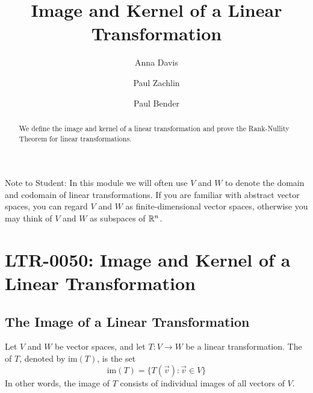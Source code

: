 \documentclass{ximera}
\author{Anna Davis \and Paul Zachlin \and Paul Bender} \title{Image and Kernel of a Linear Transformation} \license{CC-BY 4.0}
\begin{document}
\begin{abstract}
  We define the image and kernel of a linear transformation and prove the Rank-Nullity Theorem for linear transformations.
\end{abstract}
\maketitle

Note to Student:  In this module we will often use $V$ and $W$ to denote the domain and codomain of linear transformations.  If you are familiar with abstract vector spaces, you can regard $V$ and $W$ as finite-dimensional vector spaces, otherwise you may think of $V$ and $W$ as subspaces of $\mathbb{R}^n$. 

\section*{LTR-0050: Image and Kernel of a Linear Transformation}
\subsection*{The Image of a Linear Transformation}
\begin{definition}\label{def:imageofT}
Let $V$ and $W$ be vector spaces, and let $T:V\rightarrow W$ be a linear transformation.  The  of $T$, denoted by $\mbox{im}(T)$, is the set
$$\mbox{im}(T)=\{T(\vec{v}):\vec{v}\in V\}$$
In other words, the image of $T$ consists of individual images of all vectors of $V$.
\end{definition}
\end{document}
